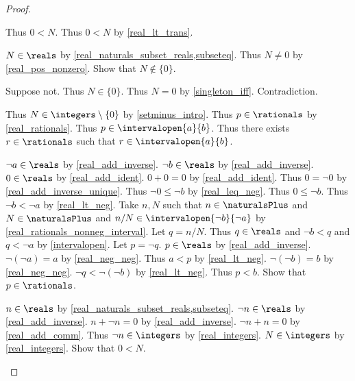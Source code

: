 \begin{proof}
\begin{byCase}
\begin{byCase}
\begin{subproof}
\begin{byCase}
                    Thus $0 < N$.
                    Thus $0 < N$ by \cref{real_lt_trans}.
                \end{byCase}
            \end{subproof}
            $N\in\reals$ by \cref{real_naturals_subset_reals,subseteq}.
            Thus $N\neq 0$ by \cref{real_pos_nonzero}.
            Show that $N\notin\{0\}$.
            \begin{subproof}
                Suppose not.
                Thus $N\in\{0\}$.
                Thus $N = 0$ by \cref{singleton_iff}.
                Contradiction.
            \end{subproof}
            Thus $N\in\integers\setminus\{0\}$ by \cref{setminus_intro}.
            Thus $p\in\rationals$ by \cref{real_rationals}.
            Thus $p\in\intervalopen{a}{b}$.
            Thus there exists $r\in\rationals$ such that $r\in\intervalopen{a}{b}$.
        \end{byCase}
        $\neg{a}\in\reals$ by \cref{real_add_inverse}.
        $\neg{b}\in\reals$ by \cref{real_add_inverse}.
        $0\in\reals$ by \cref{real_add_ident}.
        $0 + 0 = 0$ by \cref{real_add_ident}.
        Thus $0 = \neg{0}$ by \cref{real_add_inverse_unique}.
        Thus $\neg{0} \leq \neg{b}$ by \cref{real_leq_neg}.
        Thus $0 \leq \neg{b}$.
        Thus $\neg{b} < \neg{a}$ by \cref{real_lt_neg}.
        Take $n, N$ such that $n\in\naturalsPlus$ and $N\in\naturalsPlus$ and $n / N\in\intervalopen{\neg{b}}{\neg{a}}$ by \cref{real_rationals_nonneg_interval}.
        Let $q = n / N$.
        Thus $q\in\reals$ and $\neg{b} < q$ and $q < \neg{a}$ by \cref{intervalopen}.
        Let $p = \neg{q}$.
        $p\in\reals$ by \cref{real_add_inverse}.
        $\neg{(\neg{a})} = a$ by \cref{real_neg_neg}.
        Thus $a < p$ by \cref{real_lt_neg}.
        $\neg{(\neg{b})} = b$ by \cref{real_neg_neg}.
        $\neg{q} < \neg{(\neg{b})}$ by \cref{real_lt_neg}.
        Thus $p < b$.
        Show that $p\in\rationals$.
        \begin{subproof}
            $n\in\reals$ by \cref{real_naturals_subset_reals,subseteq}.
            $\neg{n}\in\reals$ by \cref{real_add_inverse}.
            $n + \neg{n} = 0$ by \cref{real_add_inverse}.
            $\neg{n} + n = 0$ by \cref{real_add_comm}.
            Thus $\neg{n}\in\integers$ by \cref{real_integers}.
            $N\in\integers$ by \cref{real_integers}.
            Show that $0 < N$.
            \begin{subproof}

\end{subproof}
\end{subproof}
\end{byCase}
\end{proof}
